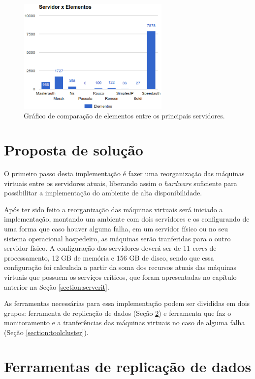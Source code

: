 \begin{figure}[h!]
 \centering
 \includegraphics[width=280px]{img/servico_elemento.eps}
 \caption{Gráfico de comparação de elementos entre os principais servidores.}
 \label{fig:servico_elemento}
\end{figure}


\section{Proposta de solução}

O primeiro passo desta implementação é fazer uma reorganização das máquinas virtuais entre os servidores atuais, liberando assim o 
\textit{hardware} suficiente para possibilitar a implementação do ambiente de alta disponibilidade. 

Após ter sido feito a reorganização das máquinas virtuais será iniciado a implementação, montando um ambiente com dois servidores e os 
configurando de uma forma que caso houver alguma falha, em um servidor físico ou no seu sistema operacional hospedeiro, as máquinas serão 
tranferidas para o outro servidor físico. 
A configuração dos servidores deverá ser de 11 \textit{cores} de processamento, 12 GB de memória e 156 GB de disco, sendo que essa configuração 
foi calculada a partir da soma dos recursos atuais das máquinas virtuais que possuem os serviços críticos, que foram apresentadas no capítulo
anterior na Seção \ref{section:servcrit}.

As ferramentas necessárias para essa implementação podem ser divididas em dois grupos: ferramenta de replicação de dados 
(Seção \ref{section:toolrepl}) e ferramenta que faz o monitoramento e a tranferências das máquinas virtuais no caso de alguma falha 
(Seção \ref{section:toolcluster}).

\section{Ferramentas de replicação de dados}
\label{section:toolrepl}

